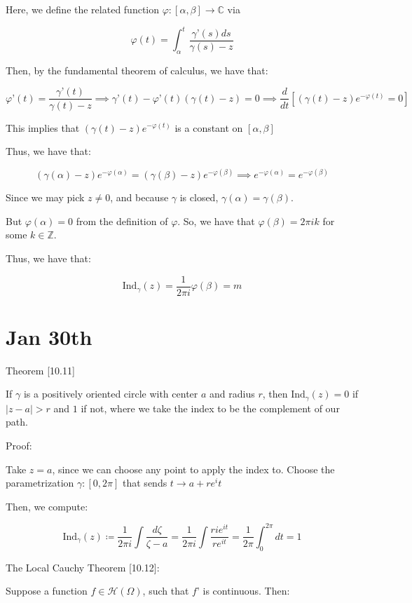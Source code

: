 \documentclass[10pt]{article}
\begin{document}
Here, we define the related function $\varphi: [\alpha,\beta] \to \mathbb{C}$ via

$$ \varphi(t) = \int_\alpha^t \frac{\gamma’(s) ds}{\gamma(s)- z} $$

Then, by the fundamental theorem of calculus, we have that:

$$ \varphi’(t) = \frac{\gamma’(t)}{\gamma(t)- z}  \implies \gamma’(t) - \varphi’(t)\left( \gamma(t) - z\right) = 0 \implies \frac{d}{dt} \left[ (\gamma(t) - z) e^{-\varphi(t)} = 0 \right]$$ 

This implies that $(\gamma(t) - z) e^{-\varphi(t)}$ is a constant on $[\alpha, \beta]$

Thus, we have that:

$$ (\gamma(\alpha) - z) e^{-\varphi(\alpha)} = (\gamma(\beta) - z) e^{-\varphi(\beta)} \implies e^{-\varphi(\alpha)} = e^{-\varphi(\beta)} $$

Since we may pick $z \not = 0$, and because $\gamma$ is closed, $\gamma(\alpha) = \gamma(\beta)$.

But $\varphi(\alpha) = 0$ from the definition of $\varphi$. So, we have that $\varphi(\beta) = 2\pi i k$ for some $k \in \mathbb{Z}$.

Thus, we have that:

$$ \text{Ind}_\gamma(z) = \frac{1}{2\pi i} \varphi(\beta) = m $$

\section*{Jan 30th}

Theorem [10.11]

If $\gamma$ is a positively oriented circle with center $a$ and radius $r$, then $\text{Ind}_\gamma(z) = 0 $ if $|z - a| > r$ and $1$ if not, where we take the index to be the complement of our path.

Proof:

Take $z = a$, since we can choose any point to apply the index to. Choose the parametrization $\gamma: [0, 2\pi]$ that sends $t \to a + r e^it$

Then, we compute:

$$\text{Ind}_\gamma(z) \coloneqq \frac{1}{2\pi i} \int \frac{d\zeta}{\zeta - a} = \frac{1}{2\pi i} \int \frac{rie^{it}}{re^{it}} = \frac{1}{2\pi} \int_0^{2\pi} dt = 1 $$

The Local Cauchy Theorem [10.12]:

Suppose a function $f \in \mathcal{H}(\Omega)$, such that $f’$ is continuous. Then:
\end{document}
